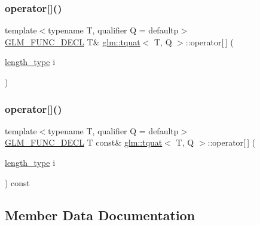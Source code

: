 \mbox{\label{structglm_1_1tquat_a0676fa7abe008f2912d296f6b3a569cf}} 
\subsubsection{\texorpdfstring{operator[]()}{operator[]()}\hspace{0.1cm}{\footnotesize\ttfamily [1/2]}}
{\footnotesize\ttfamily template$<$typename T, qualifier Q = defaultp$>$ \\
\mbox{\hyperlink{setup_8hpp_ab2d052de21a70539923e9bcbf6e83a51}{G\+L\+M\+\_\+\+F\+U\+N\+C\+\_\+\+D\+E\+CL}} T\& \mbox{\hyperlink{structglm_1_1tquat}{glm\+::tquat}}$<$ T, Q $>$\+::operator\mbox{[}$\,$\mbox{]} (\begin{DoxyParamCaption}\item[{\mbox{\hyperlink{structglm_1_1tquat_a6d9ab28781d7835b30216a996484c026}{length\+\_\+type}}}]{i }\end{DoxyParamCaption})}

\mbox{\label{structglm_1_1tquat_a88fc5911dc554c71f5933d2fb99a7a7a}} 
\subsubsection{\texorpdfstring{operator[]()}{operator[]()}\hspace{0.1cm}{\footnotesize\ttfamily [2/2]}}
{\footnotesize\ttfamily template$<$typename T, qualifier Q = defaultp$>$ \\
\mbox{\hyperlink{setup_8hpp_ab2d052de21a70539923e9bcbf6e83a51}{G\+L\+M\+\_\+\+F\+U\+N\+C\+\_\+\+D\+E\+CL}} T const\& \mbox{\hyperlink{structglm_1_1tquat}{glm\+::tquat}}$<$ T, Q $>$\+::operator\mbox{[}$\,$\mbox{]} (\begin{DoxyParamCaption}\item[{\mbox{\hyperlink{structglm_1_1tquat_a6d9ab28781d7835b30216a996484c026}{length\+\_\+type}}}]{i }\end{DoxyParamCaption}) const}



\subsection{Member Data Documentation}
\mbox{\label{structglm_1_1tquat_a7e71715c0eb0b1cd8de24fc5012594bf}} 
